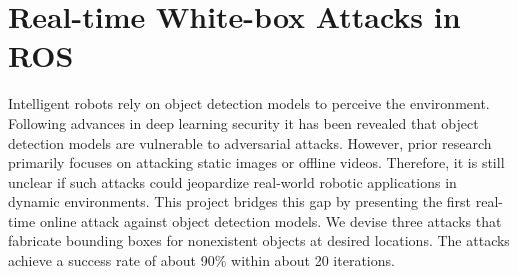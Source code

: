 



\section{Real-time White-box Attacks in ROS}
\label{sec:adv_detect}

Intelligent robots rely on object detection models to perceive the environment. Following advances in deep learning security it has been revealed that object detection models are vulnerable to adversarial attacks. However, prior research primarily focuses on attacking static images or offline videos. Therefore, it is still unclear if such attacks could jeopardize real-world robotic applications in dynamic environments. This project bridges this gap by presenting the first real-time online attack against object detection models. We devise three attacks that fabricate bounding boxes for nonexistent objects at desired locations. The attacks achieve a success rate of about 90\% within about 20 iterations. 



